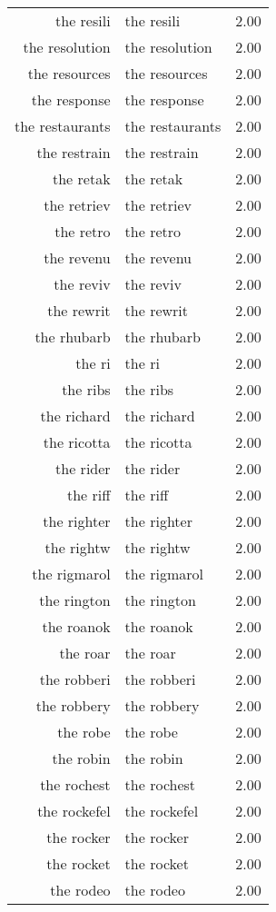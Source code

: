 \begin{table}[ht]
\begin{tabular}{rlr}
  the resili & the resili & 2.00 \\ 
  the resolution & the resolution & 2.00 \\ 
  the resources & the resources & 2.00 \\ 
  the response & the response & 2.00 \\ 
  the restaurants & the restaurants & 2.00 \\ 
  the restrain & the restrain & 2.00 \\ 
  the retak & the retak & 2.00 \\ 
  the retriev & the retriev & 2.00 \\ 
  the retro & the retro & 2.00 \\ 
  the revenu & the revenu & 2.00 \\ 
  the reviv & the reviv & 2.00 \\ 
  the rewrit & the rewrit & 2.00 \\ 
  the rhubarb & the rhubarb & 2.00 \\ 
  the ri & the ri & 2.00 \\ 
  the ribs & the ribs & 2.00 \\ 
  the richard & the richard & 2.00 \\ 
  the ricotta & the ricotta & 2.00 \\ 
  the rider & the rider & 2.00 \\ 
  the riff & the riff & 2.00 \\ 
  the righter & the righter & 2.00 \\ 
  the rightw & the rightw & 2.00 \\ 
  the rigmarol & the rigmarol & 2.00 \\ 
  the rington & the rington & 2.00 \\ 
  the roanok & the roanok & 2.00 \\ 
  the roar & the roar & 2.00 \\ 
  the robberi & the robberi & 2.00 \\ 
  the robbery & the robbery & 2.00 \\ 
  the robe & the robe & 2.00 \\ 
  the robin & the robin & 2.00 \\ 
  the rochest & the rochest & 2.00 \\ 
  the rockefel & the rockefel & 2.00 \\ 
  the rocker & the rocker & 2.00 \\ 
  the rocket & the rocket & 2.00 \\ 
  the rodeo & the rodeo & 2.00 \\ 

\end{tabular}
\end{table}
